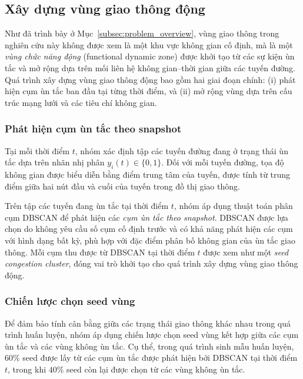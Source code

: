 \subsection{Xây dựng vùng giao thông động}
\label{subsec:dynamic_zone_construction}

Như đã trình bày ở Mục~\ref{subsec:problem_overview}, vùng giao thông trong nghiên cứu này
không được xem là một khu vực không gian cố định, mà là một \textit{vùng chức năng động}
(functional dynamic zone) được khởi tạo từ các sự kiện ùn tắc và mở rộng dựa trên mối liên hệ
không gian--thời gian giữa các tuyến đường. Quá trình xây dựng vùng giao thông động bao gồm
hai giai đoạn chính: (i) phát hiện cụm ùn tắc ban đầu tại từng thời điểm, và (ii) mở rộng vùng
dựa trên cấu trúc mạng lưới và các tiêu chí không gian.

\subsubsection{Phát hiện cụm ùn tắc theo snapshot}
\label{subsubsec:dbscan_snapshot}

Tại mỗi thời điểm $t$, nhóm xác định tập các tuyến đường đang ở trạng thái ùn tắc dựa trên
nhãn nhị phân $y_i(t) \in \{0,1\}$. Đối với mỗi tuyến đường, tọa độ không gian được biểu diễn
bằng điểm trung tâm của tuyến, được tính từ trung điểm giữa hai nút đầu và cuối của tuyến
trong đồ thị giao thông.

Trên tập các tuyến đang ùn tắc tại thời điểm $t$, nhóm áp dụng thuật toán phân cụm
DBSCAN để phát hiện các \textit{cụm ùn tắc theo snapshot}. DBSCAN được lựa chọn do không
yêu cầu số cụm cố định trước và có khả năng phát hiện các cụm với hình dạng bất kỳ, phù hợp
với đặc điểm phân bố không gian của ùn tắc giao thông.
Mỗi cụm thu được từ DBSCAN tại thời điểm $t$ được xem như một \textit{seed congestion cluster},
đóng vai trò khởi tạo cho quá trình xây dựng vùng giao thông động.\
\subsubsection{Chiến lược chọn seed vùng}
\label{subsubsec:seed_sampling}

Để đảm bảo tính cân bằng giữa các trạng thái giao thông khác nhau trong quá trình huấn luyện,
nhóm áp dụng chiến lược chọn seed vùng kết hợp giữa các cụm ùn tắc và các vùng không
ùn tắc. Cụ thể, trong quá trình sinh mẫu huấn luyện, $60\%$ seed được lấy từ các cụm ùn tắc
được phát hiện bởi DBSCAN tại thời điểm $t$, trong khi $40\%$ seed còn lại được chọn từ các
vùng không ùn tắc.

